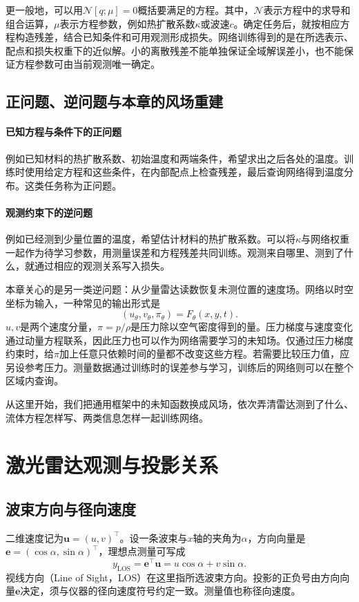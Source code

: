 更一般地，可以用$\mathcal N[q;\mu]=0$概括要满足的方程。其中，$\mathcal N$表示方程中的求导和组合运算，$\mu$表示方程参数，例如热扩散系数$\kappa$或波速$c$。确定任务后，就按相应方程构造残差，结合已知条件和可用观测形成损失。网络训练得到的是在所选表示、配点和损失权重下的近似解。小的离散残差不能单独保证全域解误差小，也不能保证方程参数可由当前观测唯一确定。

\subsection{正问题、逆问题与本章的风场重建}
\paragraph{已知方程与条件下的正问题}
例如已知材料的热扩散系数、初始温度和两端条件，希望求出之后各处的温度。训练时使用给定方程和这些条件，在内部配点上检查残差，最后查询网络得到温度分布。这类任务称为正问题。

\paragraph{观测约束下的逆问题}
例如已经测到少量位置的温度，希望估计材料的热扩散系数。可以将$\kappa$与网络权重一起作为待学习参数，用测量误差和方程残差共同训练。观测来自哪里、测到了什么，就通过相应的观测关系写入损失\cite{raissi2019pinn}。

本章关心的是另一类逆问题：从少量雷达读数恢复未测位置的速度场。网络以时空坐标为输入，一种常见的输出形式是
\begin{equation}
 (u_\theta,v_\theta,\pi_\theta)=F_\theta(x,y,t).
 \label{eq:pinn-coordinate-network}
\end{equation}
$u,v$是两个速度分量，$\pi=p/\rho$是压力除以空气密度得到的量。压力梯度与速度变化通过动量方程联系，因此压力也可以作为网络需要学习的未知场。仅通过压力梯度约束时，给$\pi$加上任意只依赖时间的量都不改变这些方程。若需要比较压力值，应另设参考压力。测量数据通过训练时的误差参与学习，训练后的网络则可以在整个区域内查询。

从这里开始，我们把通用框架中的未知函数换成风场，依次弄清雷达测到了什么、流体方程怎样写、两类信息怎样一起训练网络。

\section{激光雷达观测与投影关系}
\label{sec:pinn-lidar}

\subsection{波束方向与径向速度}
二维速度记为$\mathbf u=(u,v)^\top$。设一条波束与$x$轴的夹角为$\alpha$，方向向量是$\mathbf e=(\cos\alpha,\sin\alpha)^\top$，理想点测量可写成
\begin{equation}
 y_{\mathrm{LOS}}=\mathbf e^\top\mathbf u
 =u\cos\alpha+v\sin\alpha.
 \label{eq:pinn-observation}
\end{equation}
视线方向（Line of Sight，LOS）在这里指所选波束方向。投影的正负号由方向向量$\mathbf e$决定，须与仪器的径向速度符号约定一致。测量值也称径向速度。

